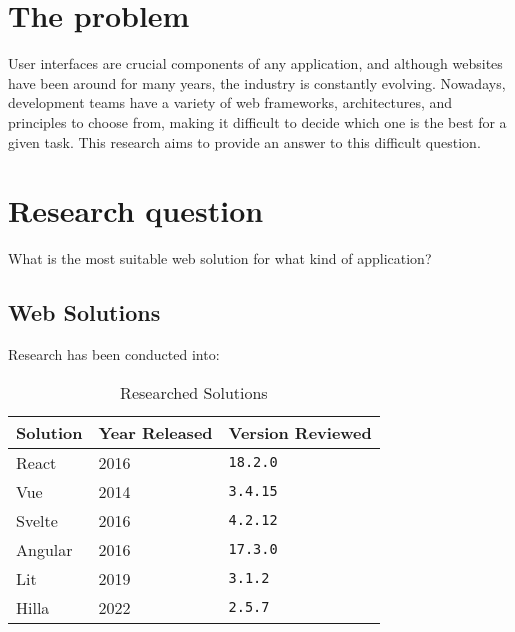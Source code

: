 \section{The problem}

User interfaces are crucial components of any application, and although websites have been around for many years, the industry is constantly evolving. Nowadays, development teams have a variety of web frameworks, architectures, and principles to choose from, making it difficult to decide which one is the best for a given task. This research aims to provide an answer to this difficult question.

\section{Research question}

What is the most suitable web solution for what kind of application?

\subsection{Web Solutions}
\label{subsec:intro:research:web_solutions}

Research has been conducted into:

\begin{table}[H]
    \centering
    \begin{tabular}{|l|l|l|}
        \hline
        Solution    & Year Released & Version Reviewed  \\ 
        \hline
        React       & 2016          & \texttt{18.2.0}   \\ \hline
        Vue         & 2014          & \texttt{3.4.15}   \\ \hline
        Svelte      & 2016          & \texttt{4.2.12}   \\ \hline
        Angular     & 2016          & \texttt{17.3.0}   \\ \hline
        Lit         & 2019          & \texttt{3.1.2}    \\ \hline
        Hilla       & 2022          & \texttt{2.5.7}    \\ \hline
    \end{tabular}
    \caption{Researched Solutions}
    \label{tab:researched_solutions}
\end{table}

